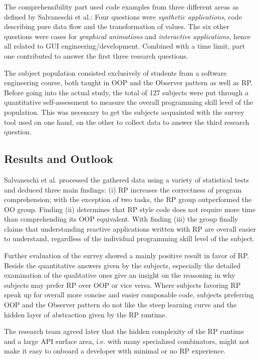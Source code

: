 \documentclass[12pt,a4paper]{article}
\begin{document}
The comprehensibility part used code examples from three different areas as defined by Salvaneschi et al.: Four questions were \emph{synthetic applications}, code describing pure data flow and the transformation of values. The six other questions were cases for \emph{graphical animations} and \emph{interactive applications}, hence all related to GUI engineering/development. Combined with a time limit, part one contributed to answer the first three research questions.

The subject population consisted exclusively of students from a software engineering course, both taught in OOP and the Observer pattern as well as RP. Before going into the actual study, the total of 127 subjects were put through a quantitative self-assessment to measure the overall programming skill level of the population. This was necessary to get the subjects acquainted with the survey tool used on one hand, on the other to collect data to answer the third research question.

\subsection{Results and Outlook}

Salvaneschi et al. \cite{7827078} processed the gathered data using a variety of statistical tests and deduced three main findings: (i) RP increases the correctness of program comprehension; with the exception of two tasks, the RP group outperformed the OO group. Finding (ii) determines that RP style code does not require more time than comprehending its OOP equivalent. With finding (iii) the group finally claims that understanding reactive applications written with RP are overall easier to understand, regardless of the individual programming skill level of the subject.

Further evaluation of the survey showed a mainly positive result in favor of RP. Beside the quantitative answers given by the subjects, especially the detailed examination of the qualitative ones give an insight on the reasoning in why subjects may prefer RP over OOP or vice versa. Where subjects favoring RP speak up for overall more concise and easier composable code, subjects preferring OOP and the Observer pattern do not like the steep learning curve and the hidden layer of abstraction given by the RP runtime.

The research team agreed later that the hidden complexity of the RP runtime and a large API surface area, i.e. with many specialized combinators, might not make it easy to onboard a developer with minimal or no RP experience.
\end{document}
